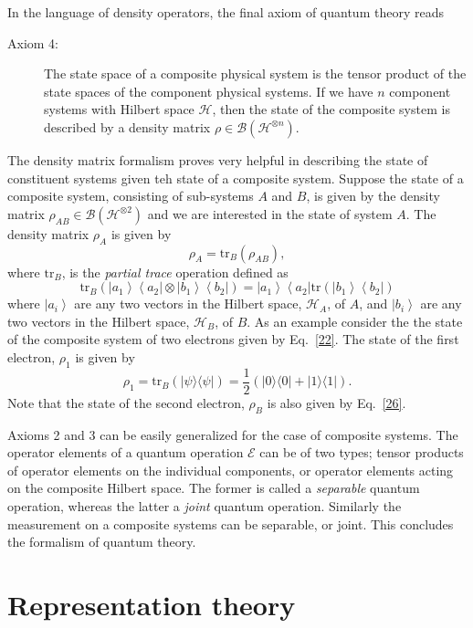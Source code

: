 \documentclass{article}
\newcommand{\ket}[1]{\left|#1\right\rangle}
\newcommand{\bra}[1]{\left\langle #1\right|}
\newcommand\defn[1]{\textsl{#1}}
\newcommand\ketbra[1]{|#1\rangle\langle#1|}
\newcommand\cH{{\mathscr{H}}}
\newcommand\cB{{\mathcal B}}
\newcommand\cE{{\mathcal E}}
\begin{document}
In the language of density operators, the final axiom of quantum theory reads     
\begin{description}
\item[Axiom 4:]  The state space of a composite physical system is the tensor
product of the state spaces of the component physical systems.  If we have $n$
component systems with Hilbert space $\cH$, then the state of the composite
system is described by a density matrix $\rho\in\cB(\cH^{\otimes n})$.
\end{description}
The density matrix formalism proves very helpful in describing the state of constituent systems given teh state of a composite system.  Suppose the state of a composite system,
consisting of sub-systems $A$ and $B$, is given by the density matrix
$\rho_{AB}\in\cB(\cH^{\otimes 2})$ and we are interested in the state of system
$A$.  The density matrix $\rho_A$ is given by
\begin{equation}
\rho_A=\mathrm{tr}_B(\rho_{AB}),
\label{24}
\end{equation}    
where $\mathrm{tr}_B$, is the \defn{partial trace} operation defined as 
\begin{equation}
\mathrm{tr}_B(\ket{a_1}\bra{a_2}\otimes\ket{b_1}\bra{b_2})=\ket{a_1}\bra{a_2}
\mathrm{tr}(\ket{b_1}\bra{b_2})
\label{25}
\end{equation}
where $\ket{a_i}$ are any two vectors in the Hilbert space, $\cH_A$, of $A$, and
$\ket{b_i}$ are any two vectors in the Hilbert space, $\cH_B$, of $B$.  As an example
consider the the state of the composite system of two electrons given by
Eq.~\eqref{22}.  The state of the first electron, $\rho_1$ is given by 
\begin{equation}
\rho_1=\mathrm{tr}_B(\ketbra{\psi})=\frac{1}{2}(\ketbra{0}+\ketbra{1}).
\label{26}
\end{equation}
Note that the state of the second electron, $\rho_B$ is also given by
Eq.~\eqref{26}.

Axioms 2 and 3 can be easily generalized for the case of composite systems.  The
operator elements of a quantum operation $\cE$ can be of two types; tensor
products of operator elements on the individual components, or operator elements
acting on the composite Hilbert space.  The former is called a \defn{separable}
quantum operation, whereas the latter a \defn{joint} quantum operation. 
Similarly the measurement on a composite systems can be separable, or joint.  This concludes the formalism of quantum theory.


\section{Representation theory}
\end{document}
